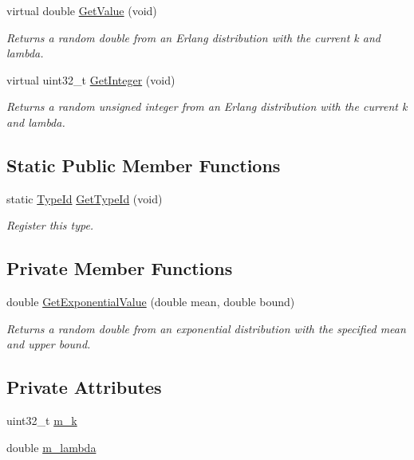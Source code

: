 \begin{DoxyCompactItemize}
virtual double \hyperlink{classns3_1_1ErlangRandomVariable_a73f65efeea94a22bb0212eeb85f949a4}{Get\+Value} (void)
\begin{DoxyCompactList}\small\item\em Returns a random double from an Erlang distribution with the current k and lambda. \end{DoxyCompactList}\item 
virtual uint32\+\_\+t \hyperlink{classns3_1_1ErlangRandomVariable_aa8ee11ddf2b88ccc7b8eb098ade5712a}{Get\+Integer} (void)
\begin{DoxyCompactList}\small\item\em Returns a random unsigned integer from an Erlang distribution with the current k and lambda. \end{DoxyCompactList}\end{DoxyCompactItemize}
\subsection*{Static Public Member Functions}
\begin{DoxyCompactItemize}
\item 
static \hyperlink{classns3_1_1TypeId}{Type\+Id} \hyperlink{classns3_1_1ErlangRandomVariable_a13edcc1751e0843c4ed57ec243ce29d9}{Get\+Type\+Id} (void)
\begin{DoxyCompactList}\small\item\em Register this type. \end{DoxyCompactList}\end{DoxyCompactItemize}
\subsection*{Private Member Functions}
\begin{DoxyCompactItemize}
\item 
double \hyperlink{classns3_1_1ErlangRandomVariable_a3cc2a2c6aee746af38bc2174ff0830c9}{Get\+Exponential\+Value} (double mean, double bound)
\begin{DoxyCompactList}\small\item\em Returns a random double from an exponential distribution with the specified mean and upper bound. \end{DoxyCompactList}\end{DoxyCompactItemize}
\subsection*{Private Attributes}
\begin{DoxyCompactItemize}
\item 
uint32\+\_\+t \hyperlink{classns3_1_1ErlangRandomVariable_aba3e31567d448969e496c45edc80aabe}{m\+\_\+k}
\item 
double \hyperlink{classns3_1_1ErlangRandomVariable_a035cbd956276b953c22eff30c979d651}{m\+\_\+lambda}
\end{DoxyCompactItemize}
